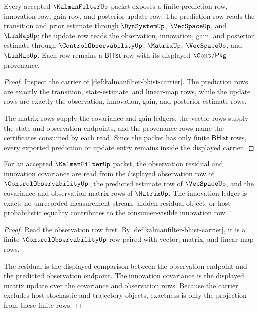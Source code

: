 \begin{theorem}
\label{thm:kalman-filter-prediction-update-route}
\label{thm:kalmanfilter-prediction-update-obligation}
Every accepted $\KalmanFilterUp$ packet exposes a finite prediction row, innovation row, gain row, and posterior-update row. The prediction row reads the transition and prior estimate through $\DynSystemUp$, $\VecSpaceUp$, and $\LinMapUp$; the update row reads the observation, innovation, gain, and posterior estimate through $\ControlObservabilityUp$, $\MatrixUp$, $\VecSpaceUp$, and $\LinMapUp$. Each row remains a $\mathsf{BHist}$ row with its displayed $\Cont/\mathsf{Pkg}$ provenance.
\end{theorem}
\begin{proof}
Inspect the carrier of \autoref{def:kalmanfilter-bhist-carrier}. The prediction rows are exactly the transition, state-estimate, and linear-map rows, while the update rows are exactly the observation, innovation, gain, and posterior-estimate rows.

The matrix rows supply the covariance and gain ledgers, the vector rows supply the state and observation endpoints, and the provenance rows name the certificates consumed by each read. Since the packet has only finite $\mathsf{BHist}$ rows, every exported prediction or update entry remains inside the displayed carrier.
\end{proof}

\begin{theorem}
\label{thm:kalmanfilter-observation-innovation-ledger}
For an accepted $\KalmanFilterUp$ packet, the observation residual and innovation covariance are read from the displayed observation row of $\ControlObservabilityUp$, the predicted estimate row of $\VecSpaceUp$, and the covariance and observation-matrix rows of $\MatrixUp$. The innovation ledger is exact: no unrecorded measurement stream, hidden residual object, or host probabilistic equality contributes to the consumer-visible innovation row.
\end{theorem}
\begin{proof}
Read the observation row first. By \autoref{def:kalmanfilter-bhist-carrier}, it is a finite $\ControlObservabilityUp$ row paired with vector, matrix, and linear-map rows.

The residual is the displayed comparison between the observation endpoint and the predicted observation endpoint. The innovation covariance is the displayed matrix update over the covariance and observation rows. Because the carrier excludes host stochastic and trajectory objects, exactness is only the projection from these finite rows.
\end{proof}

